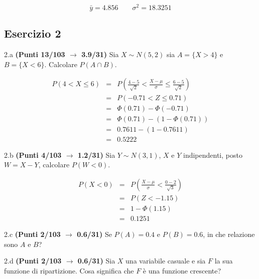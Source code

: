 \documentclass[
  11pt,
]{book}
\theoremstyle{mytheoremstyle}
\theoremstyle{mydefstyle}
\newenvironment{sol}
  {
  \begin{tcolorbox}[enhanced,breakable,arc=0.1mm,boxrule=1pt,colback=white,colframe=iblue,
  title=\bf \fontfamily{lmss}\selectfont \hspace{.5 cm} Soluzione,drop fuzzy shadow]

}{
\end{tcolorbox}
  }
\begin{document}
\begin{sol}
\[
\bar y = 4.856\qquad \sigma^2 = 18.3251
\]

\end{sol}

\subsection{Esercizio 2}\label{esercizio-2-36}

2.a \textbf{(Punti 13/103 \(\rightarrow\) 3.9/31)} Sia \(X\sim N(5,2)\) sia \(A=\{X>4\}\) e \(B=\{X<6\}\). Calcolare \(P(A\cap B)\).

\begin{sol}
\begin{eqnarray*}
   P( 4 < X \leq  6 ) &=& P\left( \frac { 4  -  5 }{\sqrt{ 2 }} < \frac { X  -  \mu }{ \sigma } \leq \frac { 6  -  5 }{\sqrt{ 2 }}\right)  \\
              &=& P\left(  -0.71  < Z \leq  0.71 \right) \\
              &=& \Phi( 0.71 )-\Phi( -0.71 )\\
              &=&  \Phi( 0.71 )-(1-\Phi( 0.71 )) \\ &=&  0.7611 -(1- 0.7611 ) \\ 
              &=&  0.5222 
   \end{eqnarray*}

\end{sol}

2.b \textbf{(Punti 4/103 \(\rightarrow\) 1.2/31)} Sia \(Y\sim N(3,1)\), \(X\) e \(Y\) indipendenti, posto \(W=X-Y\), calcolare \(P(W<0)\).

\begin{sol}
\begin{eqnarray*}
      P( X   <   0 ) 
        &=& P\left(  \frac { X  -  \mu }{ \sigma }  <  \frac { 0  -  2 }{\sqrt{ 3 }} \right)  \\
                 &=& P\left(  Z   <   -1.15 \right) \\    
                 &=&  1-\Phi( 1.15 ) \\ &=&  0.1251 
      \end{eqnarray*}

\end{sol}

2.c \textbf{(Punti 2/103 \(\rightarrow\) 0.6/31)} Se \(P(A)=0.4\) e \(P(B)=0.6\), in che relazione sono \(A\) e \(B\)?

2.d \textbf{(Punti 2/103 \(\rightarrow\) 0.6/31)} Sia \(X\) una variabile casuale e sia \(F\) la sua funzione di ripartizione. Cosa significa che \(F\) è una funzione crescente?
\end{document}
